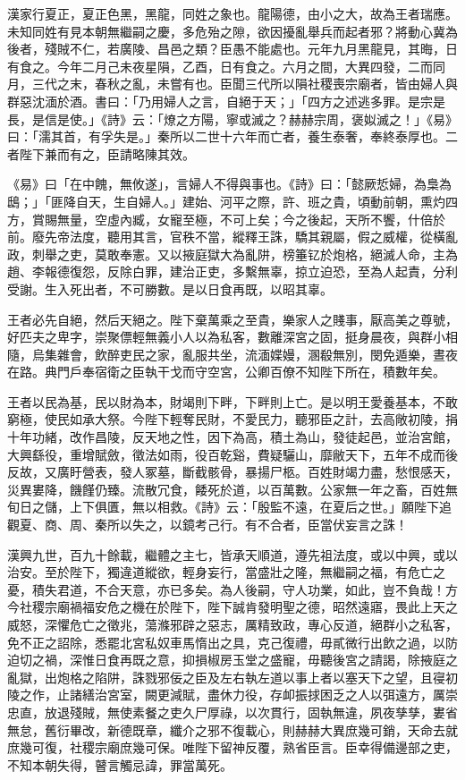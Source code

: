 \begin{pinyinscope}
漢家行夏正，夏正色黑，黑龍，同姓之象也。龍陽德，由小之大，故為王者瑞應。未知同姓有見本朝無繼嗣之慶，多危殆之隙，欲因擾亂舉兵而起者邪？將動心冀為後者，殘賊不仁，若廣陵、昌邑之類？臣愚不能處也。元年九月黑龍見，其晦，日有食之。今年二月己未夜星隕，乙酉，日有食之。六月之間，大異四發，二而同月，三代之末，春秋之亂，未嘗有也。臣聞三代所以隕社稷喪宗廟者，皆由婦人與群惡沈湎於酒。書曰：「乃用婦人之言，自絕于天；」「四方之述逃多罪。是宗是長，是信是使。」《詩》云：「燎之方陽，寧或滅之？赫赫宗周，褒姒滅之！」《易》曰：「濡其首，有孚失是。」秦所以二世十六年而亡者，養生泰奢，奉終泰厚也。二者陛下兼而有之，臣請略陳其效。

《易》曰「在中餽，無攸遂」，言婦人不得與事也。《詩》曰：「懿厥悊婦，為梟為鴟；」「匪降自天，生自婦人。」建始、河平之際，許、班之貴，頃動前朝，熏灼四方，賞賜無量，空虛內臧，女寵至極，不可上矣；今之後起，天所不饗，什倍於前。廢先帝法度，聽用其言，官秩不當，縱釋王誅，驕其親屬，假之威權，從橫亂政，刺舉之吏，莫敢奉憲。又以掖庭獄大為亂阱，榜箠钇於炮格，絕滅人命，主為趙、李報德復怨，反除白罪，建治正吏，多繫無辜，掠立迫恐，至為人起責，分利受謝。生入死出者，不可勝數。是以日食再既，以昭其辜。

王者必先自絕，然后天絕之。陛下棄萬乘之至貴，樂家人之賤事，厭高美之尊號，好匹夫之卑字，崇聚僄輕無義小人以為私客，數離深宮之固，挺身晨夜，與群小相隨，烏集雜會，飲醉吏民之家，亂服共坐，流湎媟嫚，溷殽無別，閔免遁樂，晝夜在路。典門戶奉宿衛之臣執干戈而守空宮，公卿百僚不知陛下所在，積數年矣。

王者以民為基，民以財為本，財竭則下畔，下畔則上亡。是以明王愛養基本，不敢窮極，使民如承大祭。今陛下輕奪民財，不愛民力，聽邪臣之計，去高敞初陵，捐十年功緒，改作昌陵，反天地之性，因下為高，積土為山，發徒起邑，並治宮館，大興繇役，重增賦斂，徵法如雨，役百乾谿，費疑驪山，靡敝天下，五年不成而後反故，又廣盱營表，發人冢墓，斷截骸骨，暴揚尸柩。百姓財竭力盡，愁恨感天，災異婁降，饑饉仍臻。流散冗食，餧死於道，以百萬數。公家無一年之畜，百姓無旬日之儲，上下俱匱，無以相救。《詩》云：「殷監不遠，在夏后之世。」願陛下追觀夏、商、周、秦所以失之，以鏡考己行。有不合者，臣當伏妄言之誅！

漢興九世，百九十餘載，繼體之主七，皆承天順道，遵先祖法度，或以中興，或以治安。至於陛下，獨違道縱欲，輕身妄行，當盛壯之隆，無繼嗣之福，有危亡之憂，積失君道，不合天意，亦已多矣。為人後嗣，守人功業，如此，豈不負哉！方今社稷宗廟禍福安危之機在於陛下，陛下誠肯發明聖之德，昭然遠寤，畏此上天之威怒，深懼危亡之徵兆，蕩滌邪辟之惡志，厲精致政，專心反道，絕群小之私客，免不正之詔除，悉罷北宮私奴車馬惰出之具，克己復禮，毋貳微行出飲之過，以防迫切之禍，深惟日食再既之意，抑損椒房玉堂之盛寵，毋聽後宮之請謁，除掖庭之亂獄，出炮格之陷阱，誅戮邪佞之臣及左右執左道以事上者以塞天下之望，且寑初陵之作，止諸繕治宮室，闕更減賦，盡休力役，存卹振捄困乏之人以弭遠方，厲崇忠直，放退殘賊，無使素餐之吏久尸厚祿，以次貫行，固執無違，夙夜孳孳，婁省無怠，舊衍畢改，新德既章，纖介之邪不復載心，則赫赫大異庶幾可銷，天命去就庶幾可復，社稷宗廟庶幾可保。唯陛下留神反覆，熟省臣言。臣幸得備邊部之吏，不知本朝失得，瞽言觸忌諱，罪當萬死。


\end{pinyinscope}
